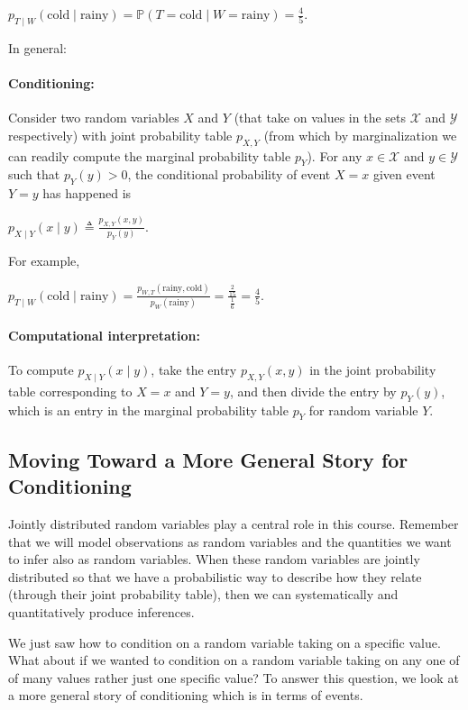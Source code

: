\documentclass[6008notes.tex]{subfiles}
\begin{document}
{\centering$p_{T\mid W}(\text {cold}\mid \text {rainy})=\mathbb {P}(T=\text {cold}\mid W=\text {rainy})=\frac{4}{5}.$ \par}
 
In general:

\paragraph{Conditioning:} Consider two random variables $X$ and $Y$ (that take on values in the sets $\mathcal{X}$ and $\mathcal{Y}$ respectively) with joint probability table $p_{X,Y}$ (from which by marginalization we can readily compute the marginal probability table $p_Y$). For any $x\in \mathcal{X}$ and $y\in \mathcal{Y}$ such that $p_{Y}(y)>0$, the conditional probability of event $X=x$ given event $Y=y$ has happened is

{\centering$p_{X\mid Y}(x\mid y)\triangleq \frac{p_{X,Y}(x,y)}{p_{Y}(y)}.$ \par}
 
For example,

{\centering$p_{T\mid W}(\text {cold}\mid \text {rainy})=\frac{p_{W,T}(\text {rainy},\text {cold})}{p_{W}(\text {rainy})}=\frac{\frac{2}{15}}{\frac{1}{6}}=\frac{4}{5}.$ \par}
 
\paragraph{Computational interpretation:} To compute $p_{X\mid Y}(x\mid y)$, take the entry $p_{X,Y}(x,y)$ in the joint probability table corresponding to $X=x$ and $Y=y$, and then divide the entry by $p_Y(y)$, which is an entry in the marginal probability table $p_Y$ for random variable $Y$.

\subsection{Moving Toward a More General Story for Conditioning}

Jointly distributed random variables play a central role in this course. Remember that we will model observations as random variables and the quantities we want to infer also as random variables. When these random variables are jointly distributed so that we have a probabilistic way to describe how they relate (through their joint probability table), then we can systematically and quantitatively produce inferences.

We just saw how to condition on a random variable taking on a specific value. What about if we wanted to condition on a random variable taking on any one of of many values rather just one specific value? To answer this question, we look at a more general story of conditioning which is in terms of events.
\end{document}
